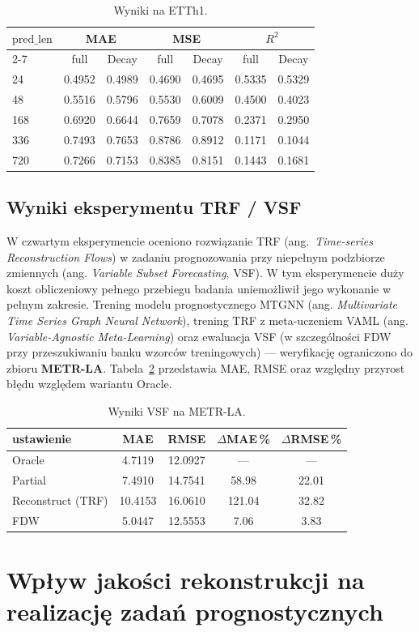 \begin{table}[htbp]
  \centering
  \caption{Wyniki na ETTh1.}
  \label{tab:rule04-etth1}
  \begin{tabular}{lcccccc}
    \hline
    $\mathrm{pred\_len}$ & \multicolumn{2}{c}{MAE} & \multicolumn{2}{c}{MSE} & \multicolumn{2}{c}{$R^2$} \\
    \cline{2-7}
     & full & Decay & full & Decay & full & Decay \\
    \hline
    24 & 0.4952 & 0.4989 & 0.4690 & 0.4695 & 0.5335 & 0.5329 \\
    48 & 0.5516 & 0.5796 & 0.5530 & 0.6009 & 0.4500 & 0.4023 \\
    168 & 0.6920 & 0.6644 & 0.7659 & 0.7078 & 0.2371 & 0.2950 \\
    336 & 0.7493 & 0.7653 & 0.8786 & 0.8912 & 0.1171 & 0.1044 \\
    720 & 0.7266 & 0.7153 & 0.8385 & 0.8151 & 0.1443 & 0.1681 \\
    \hline
  \end{tabular}
\end{table}

\subsection{Wyniki eksperymentu TRF / VSF}
\label{subsec:WynikiTRF}
W czwartym eksperymencie oceniono rozwiązanie TRF (ang.\ \textit{Time-series Reconstruction Flows}) w zadaniu prognozowania przy niepełnym podzbiorze zmiennych (ang. \textit{Variable Subset Forecasting}, VSF). W tym eksperymencie duży koszt obliczeniowy pełnego przebiegu badania uniemożliwił jego wykonanie w pełnym zakresie. Trening modelu prognostycznego MTGNN (ang. \textit{Multivariate Time Series Graph Neural Network}), trening TRF z meta-uczeniem VAML (ang. \textit{Variable-Agnostic Meta-Learning}) oraz ewaluacja VSF (w szczególności FDW przy przeszukiwaniu banku wzorców treningowych) --- weryfikację ograniczono do zbioru \textbf{METR-LA}. Tabela~\ref{tab:rule05-metr-la} przedstawia MAE, RMSE oraz względny przyrost błędu względem wariantu Oracle.

\begin{table}[htbp]
  \centering
  \caption{Wyniki VSF na METR-LA.}
  \label{tab:rule05-metr-la}
  \begin{tabular}{lcccc}
    \hline
    ustawienie & MAE & RMSE & $\Delta$MAE\,\% & $\Delta$RMSE\,\% \\
    \hline
    Oracle & 4.7119 & 12.0927 & --- & --- \\
    Partial & 7.4910 & 14.7541 & 58.98 & 22.01 \\
    Reconstruct (TRF) & 10.4153 & 16.0610 & 121.04 & 32.82 \\
    FDW & 5.0447 & 12.5553 & 7.06 & 3.83 \\
    \hline
  \end{tabular}
\end{table}


\section{Wpływ jakości rekonstrukcji na realizację zadań prognostycznych}
\label{sec:Wpływ}
